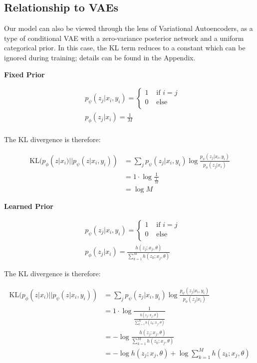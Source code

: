 \documentclass{article}
\begin{document}
\subsection{Relationship to VAEs}

Our model can also be viewed through the lens of Variational Autoencoders, as a type of conditional VAE with a zero-variance posterior network and a uniform categorical prior.
In this case, the KL term reduces to a constant which can be ignored during training; details can be found in the Appendix.

\textbf{Fixed Prior}

\begin{align}
  &p_\psi(z_j | x_i, y_i) =
  \begin{cases}
    1 & \mbox{ if } i = j \\
    0 & \mbox{ else } \\
  \end{cases} \\
  &p_\phi(z_j | x_i) = \frac{1}{M}
  \\
\end{align}

The KL divergence is therefore:

\begin{align}
\mbox{KL}(p_\phi(z | x_i) || p_\psi(z | x_i, y_i)) &= \sum_j p_\psi(z_j | x_i, y_i) \log \frac{p_\psi(z_j | x_i, y_i)}{p_\phi(z_j | x_i)} \\
&= 1 \cdot \log \frac{1}{\frac{1}{M}} \\
&= \log M
\end{align}

\textbf{Learned Prior}

\begin{align}
  &p_\psi(z_j | x_i, y_i) =
  \begin{cases}
    1 & \mbox{ if } i = j \\
    0 & \mbox{ else } \\
  \end{cases} \\
  &p_\phi(z_j | x_i) = \frac{h(z_j; x_j, \theta)}{\sum_{k=1}^M h(z_k; x_j, \theta)}
\end{align}

The KL divergence is therefore:

\begin{align}
\mbox{KL}(p_\phi(z | x_i) || p_\psi(z | x_i, y_i)) &= \sum_j p_\psi(z_j | x_i, y_i) \log \frac{p_\psi(z_j | x_i, y_i)}{p_\phi(z_j | x_i)} \\
&= 1 \cdot \log \frac{1}{\frac{h(z_j; x_j, \theta)}{\sum_{k=1}^M h(z_k; x_j, \theta)}} \\
&= - \log \frac{h(z_j; x_j, \theta)}{\sum_{k=1}^M h(z_k; x_j, \theta)} \\
&= - \log h(z_j; x_j, \theta) + \log \sum_{k=1}^M h(z_k; x_j, \theta)
\end{align}
\end{document}
